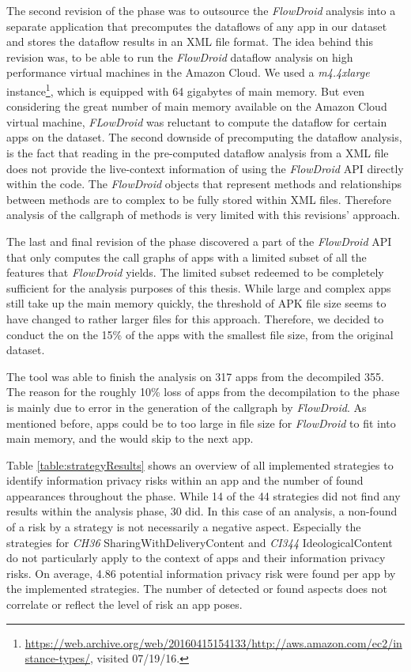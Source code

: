 The second revision of the \sca phase was to outsource the \textit{FlowDroid} analysis into a separate application that precomputes the dataflows of any app in our dataset and stores the dataflow results in an \acs{XML} file format.
The idea behind this revision was, to be able to run the \textit{FlowDroid} dataflow analysis on high performance virtual machines in the Amazon Cloud.
We used a \textit{m4.4xlarge} instance\footnote{\url{https://web.archive.org/web/20160415154133/http://aws.amazon.com/ec2/instance-types/}, visited 07/19/16.}, which is equipped with 64 gigabytes of main memory.
But even considering the great number of main memory available on the Amazon Cloud virtual machine, \textit{FLowDroid} was reluctant to compute the dataflow for certain apps on the dataset.
The second downside of precomputing the dataflow analysis, is the fact that reading in the pre-computed dataflow analysis from a XML file does not provide the live-context information of using the \textit{FlowDroid} API directly within the code.
The \textit{FlowDroid} objects that represent methods and relationships between methods are to complex to be fully stored within XML files.
Therefore analysis of the callgraph of methods is very limited with this revisions' approach.

The last and final revision of the \sca phase discovered a part of the \textit{FlowDroid} API that only computes the call graphs of apps with a limited subset of all the features that \textit{FlowDroid} yields.
The limited subset redeemed to be completely sufficient for the analysis purposes of this thesis.
While large and complex apps still take up the main memory quickly, the threshold of APK file size seems to have changed to rather larger files for this approach.
Therefore, we decided to conduct the \sca on the 15\% of the apps with the smallest file size, from the original dataset.

The \sca tool was able to finish the analysis on 317 apps from the decompiled 355.
The reason for the roughly 10\% loss of apps from the decompilation to the \sca phase is mainly due to error in the generation of the callgraph by \textit{FlowDroid}.
As mentioned before, apps could be to too large in file size for \textit{FlowDroid} to fit into main memory, and the \sca would skip to the next app.

Table \ref{table:strategyResults} shows an overview of all implemented strategies to identify information privacy risks within an app and the number of found appearances throughout the \sca phase.
While 14 of the 44 strategies did not find any \ipr results within the analysis phase, 30 did.
In this case of an \ipr analysis, a non-found of a risk by a strategy is not necessarily a negative aspect.
Especially the strategies for \textit{CH36} SharingWithDeliveryContent and \textit{CI344} IdeologicalContent do not particularly apply to the context of \mH apps and their information privacy risks.
On average, 4.86 potential information privacy risk were found per app by the implemented strategies.
The number of detected or found \ipr aspects does not correlate or reflect the level of risk an app poses.

